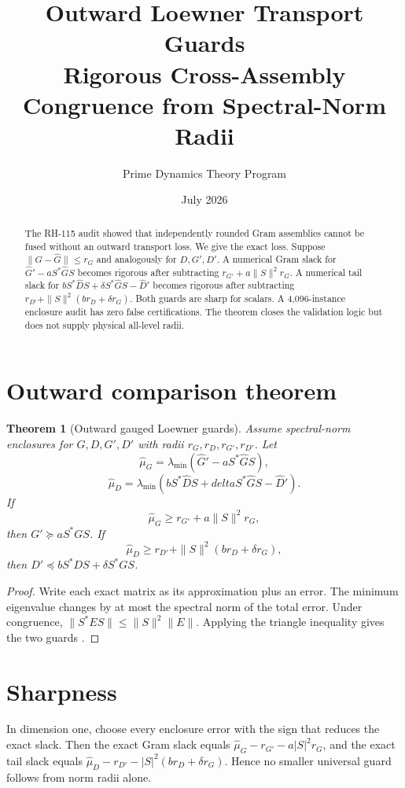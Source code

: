 \documentclass[12pt]{article}\usepackage[margin=1in]{geometry}\usepackage{amsmath,amssymb,amsthm,graphicx,natbib,microtype}\newtheorem{theorem}{Theorem}\newtheorem{corollary}[theorem]{Corollary}
\title{Outward Loewner Transport Guards\\\large Rigorous Cross-Assembly Congruence from Spectral-Norm Radii}\author{Prime Dynamics Theory Program}\date{July 2026}
\begin{document}
\maketitle
\begin{abstract}
The RH-115 audit showed that independently rounded Gram assemblies cannot be
fused without an outward transport loss.  We give the exact loss.  Suppose
$\|G-\widehat G\|\leq r_G$ and analogously for $D,G',D'$.  A numerical Gram
slack for $\widehat G'-aS^*\widehat GS$ becomes rigorous after subtracting
$r_{G'}+a\|S\|^2r_G$.  A numerical tail slack for
$bS^*\widehat DS+\delta S^*\widehat GS-\widehat D'$ becomes rigorous after
subtracting $r_{D'}+\|S\|^2(br_D+\delta r_G)$.  Both guards are sharp for
scalars.  A 4,096-instance enclosure audit has zero false certifications.
The theorem closes the validation logic but does not supply physical
all-level radii.
\end{abstract}
\section{Outward comparison theorem}
\begin{theorem}[Outward gauged Loewner guards]\label{thm:guards}
Assume spectral-norm enclosures for $G,D,G',D'$ with radii
$r_G,r_D,r_{G'},r_{D'}$.  Let
\[
\widehat\mu_G=\lambda_{\min}(\widehat G'-aS^*\widehat GS),
\]
\[
\widehat\mu_D=\lambda_{\min}(bS^*\widehat DS+delta S^*\widehat GS-\widehat D').
\]
If
\[
\widehat\mu_G\geq r_{G'}+a\|S\|^2r_G,
\]
then $G'\succeq aS^*GS$.  If
\[
\widehat\mu_D\geq r_{D'}+\|S\|^2(br_D+\delta r_G),
\]
then $D'\preceq bS^*DS+\delta S^*GS$.
\end{theorem}
\begin{proof}
Write each exact matrix as its approximation plus an error.  The minimum
eigenvalue changes by at most the spectral norm of the total error.  Under
congruence, $\|S^*ES\|\leq\|S\|^2\|E\|$.  Applying the triangle inequality
gives the two guards \citep{Moore1966,HornJohnson1991}.
\end{proof}

\section{Sharpness}
In dimension one, choose every enclosure error with the sign that reduces
the exact slack.  Then the exact Gram slack equals
$\widehat\mu_G-r_{G'}-a|S|^2r_G$, and the exact tail slack equals
$\widehat\mu_D-r_{D'}-|S|^2(br_D+\delta r_G)$.  Hence no smaller universal
guard follows from norm radii alone.
\end{document}
